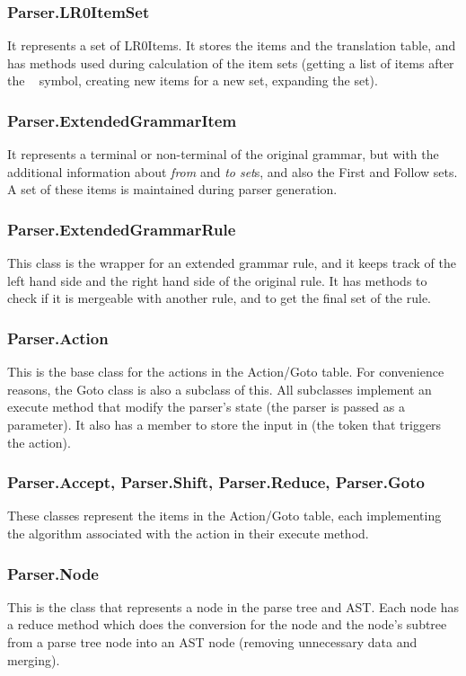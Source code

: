 \subsubsection{Parser.LR0ItemSet}
It represents a set of LR0Items. It stores the items and the translation table, and has methods used during calculation of the item sets (getting a list of items after the \textbullet ~ symbol, creating new items for a new set, expanding the set).
\subsubsection{Parser.ExtendedGrammarItem}
It represents a terminal or non-terminal of the original grammar, but with the additional information about \textit{from} and \textit{to set}s, and also the First and Follow sets. A set of these items is maintained during parser generation.
\subsubsection{Parser.ExtendedGrammarRule}
This class is the wrapper for an extended grammar rule, and it keeps track of the left hand side and the right hand side of the original rule. It has methods to check if it is mergeable with another rule, and to get the final set of the rule.
\subsubsection{Parser.Action}
This is the base class for the actions in the Action/Goto table. For convenience reasons, the Goto class is also a subclass of this. All subclasses implement an execute method that modify the parser's state (the parser is passed as a parameter). It also has a member to store the input in (the token that triggers the action).
\subsubsection{Parser.Accept, Parser.Shift, Parser.Reduce, Parser.Goto}
These classes represent the items in the Action/Goto table, each implementing the algorithm associated with the action in their execute method.
\subsubsection{Parser.Node}
This is the class that represents a node in the parse tree and AST. Each node has a reduce method which does the conversion for the node and the node's subtree from a parse tree node into an AST node (removing unnecessary data and merging).
